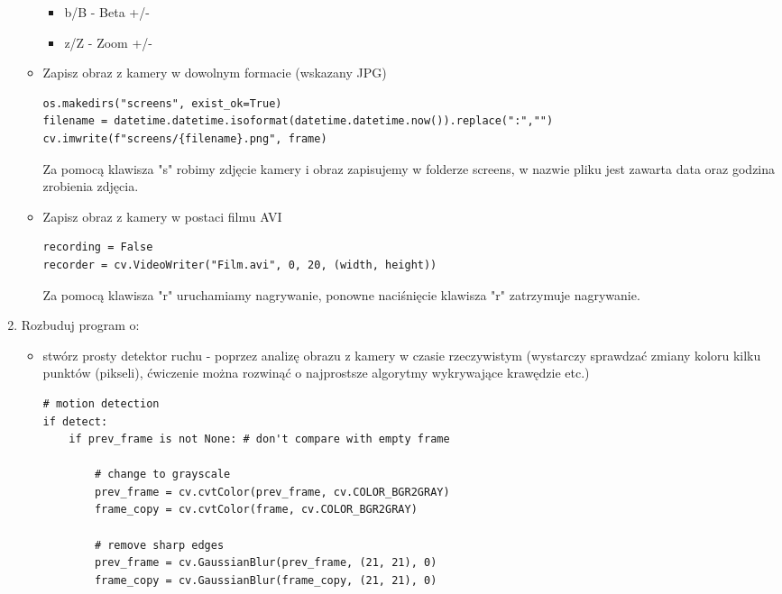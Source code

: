\documentclass[a4paper,12pt]{extarticle}  %
\begin{document}
\begin{enumerate}
\begin{itemize}
\begin{itemize}
	\item b/B - Beta +/-
	\item z/Z - Zoom +/-
\end{itemize}
		      \item Zapisz obraz z kamery w dowolnym formacie (wskazany JPG)
			  \begin{lstlisting}
os.makedirs("screens", exist_ok=True)              
filename = datetime.datetime.isoformat(datetime.datetime.now()).replace(":","")
cv.imwrite(f"screens/{filename}.png", frame)
\end{lstlisting}
			  Za pomocą klawisza "s" robimy zdjęcie kamery i obraz zapisujemy w folderze screens, w nazwie pliku jest zawarta data oraz godzina zrobienia zdjęcia.
		      \item Zapisz obraz z kamery w postaci filmu AVI
		            \begin{lstlisting}
recording = False
recorder = cv.VideoWriter("Film.avi", 0, 20, (width, height))
\end{lstlisting}
		            Za pomocą klawisza "r" uruchamiamy nagrywanie, ponowne naciśnięcie klawisza "r" zatrzymuje nagrywanie.
	      \end{itemize}
	\item Rozbuduj program o:
	      \begin{itemize}
		      \item stwórz prosty detektor ruchu - poprzez analizę obrazu z kamery w czasie rzeczywistym (wystarczy sprawdzać zmiany koloru kilku punktów (pikseli), ćwiczenie można rozwinąć o najprostsze algorytmy wykrywające krawędzie etc.)
\begin{lstlisting}
# motion detection
if detect:
	if prev_frame is not None: # don't compare with empty frame
		
		# change to grayscale
		prev_frame = cv.cvtColor(prev_frame, cv.COLOR_BGR2GRAY)
		frame_copy = cv.cvtColor(frame, cv.COLOR_BGR2GRAY)

		# remove sharp edges
		prev_frame = cv.GaussianBlur(prev_frame, (21, 21), 0)
		frame_copy = cv.GaussianBlur(frame_copy, (21, 21), 0)


\end{lstlisting}
\end{itemize}
\end{enumerate}
\end{document}
